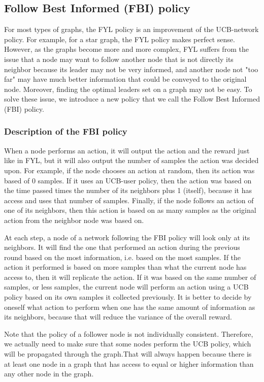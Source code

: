 \documentclass{article}
\begin{document}
\subsection{Follow Best Informed (FBI) policy}

For most types of graphs, the FYL policy is an improvement of the UCB-network policy. For example, for a star graph, the FYL policy makes perfect sense. However, as the graphs become more and more complex, FYL suffers from the issue that a node may want to follow another node that is not directly its neighbor because its leader may not be very informed, and another node not "too far" may have much better information that could be conveyed to the original node. Moreover, finding the optimal leaders set on a graph may not be easy. To solve these issue, we introduce a new policy that we call the Follow Best Informed (FBI) policy.

\subsubsection{Description of the FBI policy}

When a node performs an action, it will output the action and the reward just like in FYL, but it will also output the number of samples the action was decided upon. For example, if the node chooses an action at random, then its action was based of 0 samples. If it uses an UCB-user policy, then the action was based on the time passed times the number of its neighbors plus 1 (itself), because it has access and uses that number of samples. Finally, if the node follows an action of one of its neighbors, then this action is based on as many samples as the original action from the neighbor node was based on.

At each step, a node of a network following the FBI policy will look only at its neighbors. It will find the one that performed an action during the previous round based on the most information, i.e. based on the most samples. If the action it performed is based on more samples than what the current node has access to, then it will replicate the action. If it was based on the same number of samples, or less samples, the current node will perform an action using a UCB policy based on its own samples it collected previously. It is better to decide by oneself what action to perform when one has the same amount of information as its neighbors, because that will reduce the variance of the overall reward.

Note that the policy of a follower node is not individually consistent. Therefore, we actually need to make sure that some nodes perform the UCB policy, which will be propagated through the graph.That will always happen because there is at least one node in a graph that has access to equal or higher information than any other node in the graph.
\end{document}
